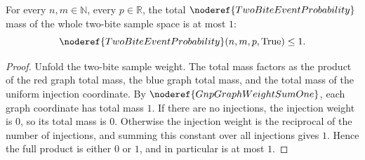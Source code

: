 \begin{helper}
For every \(n,m\in\mathbb N\), every \(p\in\mathbb R\), the total
\(\noderef{TwoBiteEventProbability}\) mass of the whole two-bite sample space is
at most \(1\):
\[
\noderef{TwoBiteEventProbability}(n,m,p,\mathrm{True})\le 1.
\]
\end{helper}
\begin{proof}
Unfold the two-bite sample weight.  The total mass factors as the product of
the red graph total mass, the blue graph total mass, and the total mass of the
uniform injection coordinate.  By \(\noderef{GnpGraphWeightSumOne}\), each graph
coordinate has total mass \(1\).  If there are no injections, the injection
weight is \(0\), so its total mass is \(0\).  Otherwise the injection weight is
the reciprocal of the number of injections, and summing this constant over all
injections gives \(1\).  Hence the full product is either \(0\) or \(1\), and in
particular is at most \(1\).
\end{proof}

